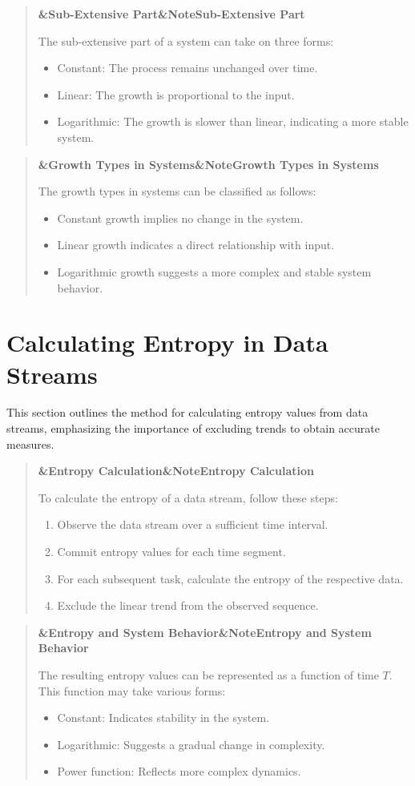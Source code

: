 \documentclass[a4paper]{article}
\newcommand{\boxheading}[1]{%
  \par\smallskip
  \noindent\textbf{\ifx&#1&Note\else#1\fi}\par
  \smallskip
}
\newenvironment{thmbox}[1][]{%
  \begin{quote}\color{blue!60!black}\boxheading{#1}\normalcolor
}{\end{quote}}
\newenvironment{defbox}[1][]{%
  \begin{quote}\color{green!40!black}\boxheading{#1}\normalcolor
}{\end{quote}}
\newenvironment{rembox}[1][]{%
  \begin{quote}\color{black!70}\boxheading{#1}\normalcolor
}{\end{quote}}
\begin{document}
\begin{defbox}[Sub-Extensive Part]
The sub-extensive part of a system can take on three forms:
\begin{itemize}
    \item Constant: The process remains unchanged over time.
    \item Linear: The growth is proportional to the input.
    \item Logarithmic: The growth is slower than linear, indicating a more stable system.
\end{itemize}
\end{defbox}

\begin{thmbox}[Growth Types in Systems]
The growth types in systems can be classified as follows:
\begin{itemize}
    \item Constant growth implies no change in the system.
    \item Linear growth indicates a direct relationship with input.
    \item Logarithmic growth suggests a more complex and stable system behavior.
\end{itemize}
\end{thmbox}

\section{Calculating Entropy in Data Streams}
This section outlines the method for calculating entropy values from data streams, emphasizing the importance of excluding trends to obtain accurate measures.

\begin{rembox}[Entropy Calculation]
To calculate the entropy of a data stream, follow these steps:
\begin{enumerate}
    \item Observe the data stream over a sufficient time interval.
    \item Commit entropy values for each time segment.
    \item For each subsequent task, calculate the entropy of the respective data.
    \item Exclude the linear trend from the observed sequence.
\end{enumerate}
\end{rembox}

\begin{defbox}[Entropy and System Behavior]
The resulting entropy values can be represented as a function of time \( T \). This function may take various forms:
\begin{itemize}
    \item Constant: Indicates stability in the system.
    \item Logarithmic: Suggests a gradual change in complexity.
    \item Power function: Reflects more complex dynamics.
\end{itemize}
\end{defbox}
\end{document}
